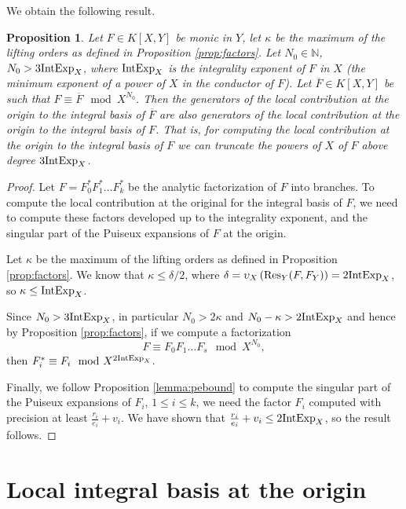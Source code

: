 \documentclass[a4paper,11pt,reqno]{amsart}%
\theoremstyle{definition}
\theoremstyle{plain}
\newtheorem{proposition}[definition]{Proposition}
\theoremstyle{remark}
\newcommand{\N}{{\mathbb N}}
\newcommand\ct[1]{\text{\rmfamily\upshape #1}}
\newcommand{\IntExpX}{\ct{IntExp}_X}
\begin{document}
We obtain the following result.

\begin{proposition}
\label{prop:truncX}
Let $F \in K[X,Y]$ be monic in $Y$, let $\kappa$ be the maximum of the lifting orders as defined in Proposition \ref{prop:factors}.
Let $N_0 \in \N$, $N_0 > 3\IntExpX$, where $\IntExpX$ is the integrality exponent of $F$ in $X$ (the minimum exponent of a power of $X$ in the conductor of $F$).  Let $\overline F \in K[X,Y]$ be such that $F \equiv \overline{F} \mod X^{N_0}$. Then the generators of the local contribution at the origin to the integral basis of $\overline F$ are also generators of the local contribution at the origin to the integral basis of $F$. That is, for computing the local contribution at the origin to the integral basis of $F$ we can truncate the powers of $X$ of $F$ above degree $3 \IntExpX$.
\end{proposition}

\begin{proof}
Let $F = F_0^* F_1^* \dots F_k^*$ be the analytic factorization of $F$ into branches.
To compute the local contribution at the original for the integral basis of $F$, we need to compute these factors developed up to the integrality exponent, and the singular part of the Puiseux expansions of $F$ at the origin.

Let $\kappa$ be the maximum of the lifting orders as defined in Proposition \ref{prop:factors}.
We know that $\kappa \le \delta / 2$, where $\delta = \upsilon_X \left( \operatorname{Res}_Y(F, F_Y) \right) = 2 \IntExpX$, so $\kappa \le \IntExpX$.

Since $N_0 > 3 \IntExpX$, in particular $N_0 > 2 \kappa$ and $N_0 - \kappa > 2\IntExpX$ and hence by Proposition \ref{prop:factors}, if we compute a factorization
$$
F \equiv  F_0 F_1 \dots F_s \mod X^{N_0},
$$
then $F_i^* \equiv F_i \mod X^{2 \IntExpX}$.

Finally, we follow Proposition \ref{lemma:pebound} to compute the singular part of the Puiseux expansions of $F_i$, $1 \le i \le k$, we need the factor $F_i$ computed with precision at least $\frac{r_i}{e_i} + v_i$. We have shown that $\frac{r_i}{e_i} + v_i \le 2\IntExpX$, so the result follows.
\end{proof}



\section{Local integral basis at the origin}
\end{document}
